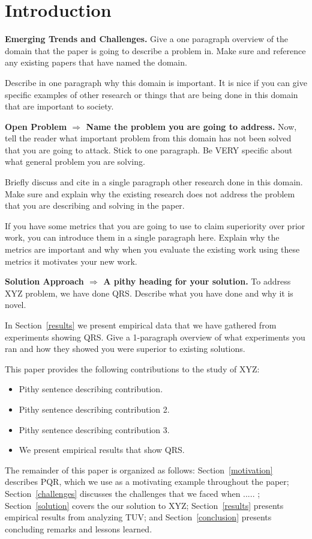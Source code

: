 \section{Introduction}

\textbf{Emerging Trends and Challenges.}
Give a one paragraph overview of the domain that
the paper is going to describe a problem in. Make
sure and reference any existing papers that have
named the domain.

Describe in one paragraph why this domain is important.
It is nice if you can give specific examples of other
research or things that are being done in this domain
that are important to society.

\textbf{Open Problem $\Rightarrow$ Name the problem
you are going to address.}
Now, tell the reader what important problem from
this domain has not been solved that you are going
to attack. Stick to one paragraph. Be VERY specific about what general
problem you are solving.

Briefly discuss and cite in a single paragraph other
research done in this domain. Make sure and explain
why the existing research does not address the
problem that you are describing and solving in the
paper.

If you have some metrics that you are going
to use to claim superiority over prior work, you
can introduce them in a single paragraph here.
Explain why the metrics are important and why
when you evaluate the existing work using these
metrics it motivates your new work.

\textbf{Solution Approach $\Rightarrow$ A pithy
heading for your solution.} To address XYZ
problem, we have done QRS. Describe what you
have done and why it is novel.

In Section~\ref{results} we present empirical
data that we have gathered from experiments
showing QRS. Give a 1-paragraph overview of
what experiments you ran and how they showed
you were superior to existing solutions.

This paper provides the following contributions
to the study of XYZ:

\begin{itemize}

\item Pithy sentence describing contribution.

\item Pithy sentence describing contribution 2.

\item Pithy sentence describing contribution 3.

\item We present empirical results that show QRS.

\end{itemize}

%
The remainder of this paper is organized as follows:
Section~\ref{motivation} describes PQR, which we
use as a motivating example throughout the paper;
Section~\ref{challenges} discusses the challenges that
we faced when ..... ; Section~\ref{solution} covers the our solution to XYZ; Section~\ref{results} presents empirical
results from analyzing TUV; and Section~\ref{conclusion}
presents concluding remarks and lessons learned.
